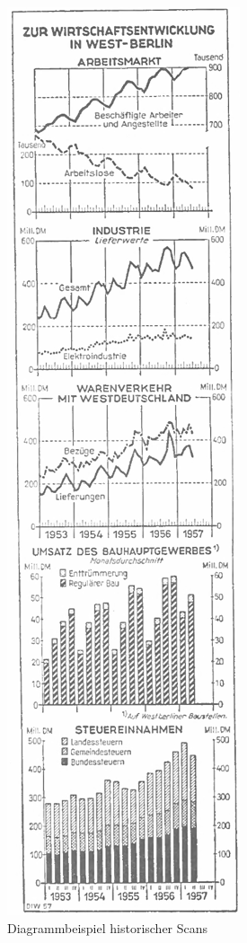 \begin{figure}
    \centering
    \includegraphics[width=\linewidth]{Methodik/img/scanbank_example.png}
    \caption{ Diagrammbeispiel historischer Scans}
    \label{fig:scanbank_example}
\end{figure}
